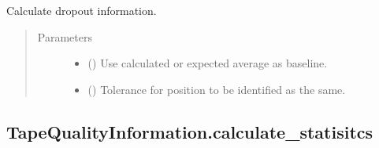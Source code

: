 \documentclass[letterpaper,10pt,english]{sphinxmanual}
\begin{document}
\begin{fulllineitems}
\begin{fulllineitems}
\label{\detokenize{generated/quality_assessment.tape_quality_information.TapeQualityInformation.calculate_drop_out_info:quality_assessment.tape_quality_information.TapeQualityInformation.calculate_drop_out_info}}
\sphinxAtStartPar
Calculate drop\sphinxhyphen{}out information.
\begin{quote}\begin{description}
\item[{Parameters}] \leavevmode\begin{itemize}
\item {} 
\sphinxAtStartPar
{} () \textendash{} Use calculated or expected average as baseline.

\item {} 
\sphinxAtStartPar
{} () \textendash{} Tolerance for position to be identified as the same.

\end{itemize}

\end{description}\end{quote}

\end{fulllineitems}



\subsection{TapeQualityInformation.calculate\_statisitcs}
\label{\detokenize{generated/quality_assessment.tape_quality_information.TapeQualityInformation.calculate_statisitcs:tapequalityinformation-calculate-statisitcs}}\label{\detokenize{generated/quality_assessment.tape_quality_information.TapeQualityInformation.calculate_statisitcs::doc}}


\end{fulllineitems}
\end{document}
